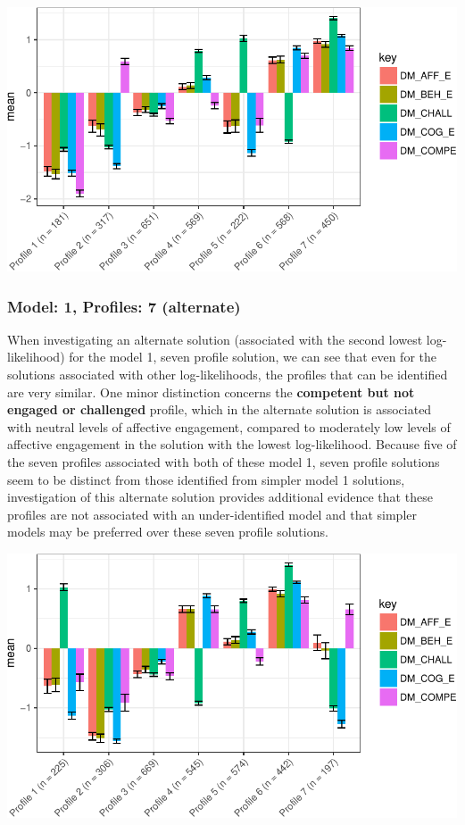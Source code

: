 \documentclass[]{msu-thesis}
\theoremstyle{definition}
\theoremstyle{definition}
\theoremstyle{definition}
\theoremstyle{remark}
\begin{document}
\begin{center}\includegraphics[width=0.8\linewidth]{rosenberg-dissertation_files/figure-latex/m1_7p-1} \end{center}

\subsubsection{Model: 1, Profiles: 7
(alternate)}\label{model-1-profiles-7-alternate}

When investigating an alternate solution (associated with the second
lowest log-likelihood) for the model 1, seven profile solution, we can
see that even for the solutions associated with other log-likelihoods,
the profiles that can be identified are very similar. One minor
distinction concerns the \textbf{competent but not engaged or
challenged} profile, which in the alternate solution is associated with
neutral levels of affective engagement, compared to moderately low
levels of affective engagement in the solution with the lowest
log-likelihood. Because five of the seven profiles associated with both
of these model 1, seven profile solutions seem to be distinct from those
identified from simpler model 1 solutions, investigation of this
alternate solution provides additional evidence that these profiles are
not associated with an under-identified model and that simpler models
may be preferred over these seven profile solutions.

\begin{center}\includegraphics[width=0.8\linewidth]{rosenberg-dissertation_files/figure-latex/m1_7-other-LL-p-1} \end{center}
\end{document}
